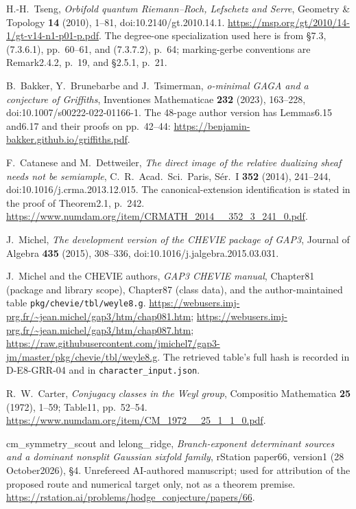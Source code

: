 H.-H.~Tseng, \emph{Orbifold quantum Riemann--Roch, Lefschetz and Serre},
Geometry \& Topology \textbf{14} (2010), 1--81,
doi:10.2140/gt.2010.14.1.
\url{https://msp.org/gt/2010/14-1/gt-v14-n1-p01-p.pdf}.
The degree-one specialization used here is from \S7.3,
(7.3.6.1), pp.~60--61, and (7.3.7.2), p.~64;
marking-gerbe conventions are Remark2.4.2, p.~19, and \S2.5.1, p.~21.

B.~Bakker, Y.~Brunebarbe and J.~Tsimerman,
\emph{o-minimal GAGA and a conjecture of Griffiths},
Inventiones Mathematicae \textbf{232} (2023), 163--228,
doi:10.1007/s00222-022-01166-1.
The 48-page author version has Lemmas6.15 and6.17 and their
proofs on pp.~42--44:
\url{https://benjamin-bakker.github.io/griffiths.pdf}.

F.~Catanese and M.~Dettweiler,
\emph{The direct image of the relative dualizing sheaf needs not be semiample},
C.~R.~Acad.~Sci.~Paris, S\'er.~I \textbf{352} (2014), 241--244,
doi:10.1016/j.crma.2013.12.015.
The canonical-extension identification is stated in the proof of
Theorem2.1, p.~242.
\url{https://www.numdam.org/item/CRMATH_2014__352_3_241_0.pdf}.

J.~Michel, \emph{The development version of the CHEVIE package of GAP3},
Journal of Algebra \textbf{435} (2015), 308--336,
doi:10.1016/j.jalgebra.2015.03.031.

J.~Michel and the CHEVIE authors,
\emph{GAP3 CHEVIE manual}, Chapter81 (package and library scope),
Chapter87 (class data), and the author-maintained table
\texttt{pkg/chevie/tbl/weyle8.g}.
\url{https://webusers.imj-prg.fr/~jean.michel/gap3/htm/chap081.htm};
\url{https://webusers.imj-prg.fr/~jean.michel/gap3/htm/chap087.htm};
\url{https://raw.githubusercontent.com/jmichel7/gap3-jm/master/pkg/chevie/tbl/weyle8.g}.
The retrieved table's full hash is recorded in D-E8-GRR-04 and in
\texttt{character\_input.json}.

R.~W.~Carter, \emph{Conjugacy classes in the Weyl group},
Compositio Mathematica \textbf{25} (1972), 1--59;
Table11, pp.~52--54.
\url{https://www.numdam.org/item/CM_1972__25_1_1_0.pdf}.

cm\_symmetry\_scout and lelong\_ridge,
\emph{Branch-exponent determinant sources and a dominant nonsplit
Gaussian sixfold family}, rStation paper66, version1 (28 October2026),
\S4.  Unrefereed AI-authored manuscript; used for attribution of
the proposed route and numerical target only, not as a theorem premise.
\url{https://rstation.ai/problems/hodge_conjecture/papers/66}.
